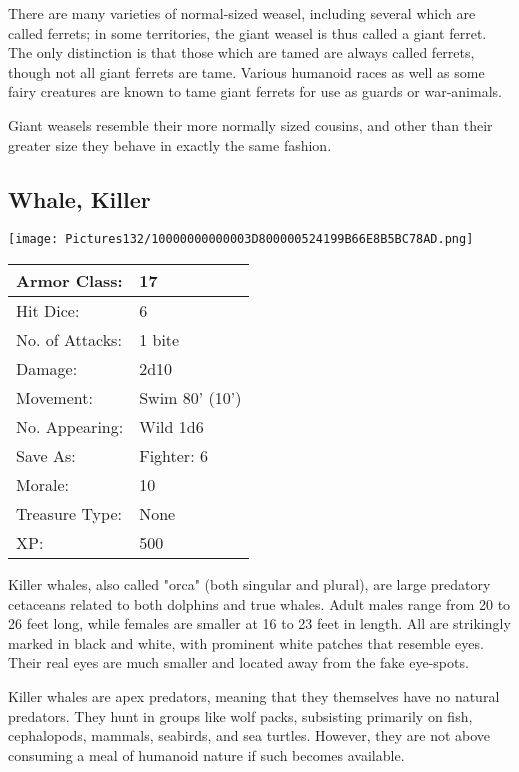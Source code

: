 \documentclass[a4paper,twoside,openany,10pt]{book}
\begin{document}
\begin{multicols}{2}
There are many varieties of normal-sized weasel, including several which are called ferrets; in some territories, the giant weasel is thus called a giant ferret. The only distinction is that those which are tamed are always called ferrets, though not all giant ferrets are tame. Various humanoid races as well as some fairy creatures are known to tame giant ferrets for use as guards or war-animals.

Giant weasels resemble their more normally sized cousins, and other than their greater size they behave in exactly the same fashion.

\subsection*{Whale, Killer}\label{whale-killer}



\begin{center} \texttt{[image: Pictures132/10000000000003D800000524199B66E8B5BC78AD.png]} \end{center}


\begin{tabularx}{0.50\textwidth}{@{}lX@{}}
Armor Class: & 17 \\\hline
Hit Dice: & 6 \\\hline
No. of Attacks: & 1 bite \\\hline
Damage: & 2d10 \\\hline
Movement: & Swim 80' (10') \\\hline
No. Appearing: & Wild 1d6 \\\hline
Save As: & Fighter: 6 \\\hline
Morale: & 10 \\\hline
Treasure Type: & None \\\hline
XP: & 500 \\\hline
\end{tabularx}


Killer whales, also called "orca" (both singular and plural), are large predatory cetaceans related to both dolphins and true whales. Adult males range from 20 to 26 feet long, while females are smaller at 16 to 23 feet in length. All are strikingly marked in black and white, with prominent white patches that resemble eyes. Their real eyes are much smaller and located away from the fake eye-spots.

Killer whales are apex predators, meaning that they themselves have no natural predators. They hunt in groups like wolf packs, subsisting primarily on fish, cephalopods, mammals, seabirds, and sea turtles. However, they are not above consuming a meal of humanoid nature if such becomes available. 



\end{multicols}
\end{document}
